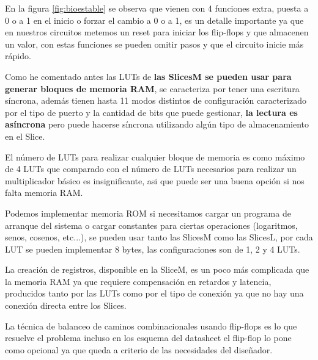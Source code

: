 \documentclass[11pt,a4paper]{article}
\begin{document}
En la figura \ref{fig:bioestable} se observa que vienen con 4 funciones extra, puesta a 0 o a 1 en el inicio o forzar el cambio a 0 o a 1, es un detalle importante ya que en nuestros circuitos metemos un reset para iniciar los flip-flops y que almacenen un valor, con estas funciones se pueden omitir pasos y que el circuito inicie más rápido.
\begin{figure}
  \vspace{-0.05\textwidth}
    \vspace*{-0.05\textwidth}
\end{figure}

 Como he comentado antes las LUTs de \textbf{las SlicesM se pueden usar para generar bloques de memoria RAM}, se caracteriza por tener una escritura síncrona, además tienen hasta 11 modos distintos de configuración caracterizado por el tipo de puerto y la cantidad de bits que puede gestionar, \textbf{la lectura es asíncrona} pero puede hacerse síncrona utilizando algún tipo de almacenamiento en el Slice.
 
El número de LUTs para realizar cualquier bloque de memoria es como máximo de 4 LUTs que comparado con el número de LUTs necesarios para realizar un multiplicador básico es insignificante, asi que puede ser una buena opción si nos falta memoria RAM.\par

Podemos implementar memoria ROM si necesitamos cargar un programa de arranque del sistema o cargar constantes para ciertas operaciones (logaritmos, senos, cosenos, etc...), se pueden usar tanto las SlicesM como las SlicesL, por cada LUT se pueden implementar 8 bytes, las configuraciones son de 1, 2 y 4 LUTs.\par
 \begin{figure}
    \flushleft
    \vspace*{-0.05\textwidth}
\end{figure}\par
La creación de registros, disponible en la SliceM, es un poco más complicada que la memoria RAM ya que requiere compensación en retardos y latencia, producidos tanto por las LUTs como por el tipo de conexión ya que no hay una conexión directa entre los Slices.

La técnica de balanceo de caminos combinacionales usando flip-flops es lo que resuelve el problema incluso en los esquema del datasheet el flip-flop lo pone como opcional ya que queda a criterio de las necesidades del diseñador.
\end{document}

